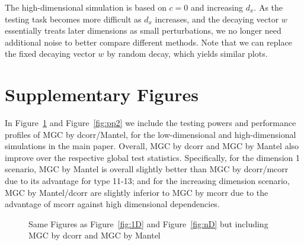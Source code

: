 \documentclass[11pt]{article}
\begin{document}
The high-dimensional simulation is based on $c=0$ and increasing $d_{x}$. As the testing task becomes more difficult as $d_{x}$ increases, and the decaying vector $w$ essentially treats later dimensions as small perturbations, we no longer need additional noise to better compare different methods. Note that we can replace the fixed decaying vector $w$ by random decay, which yields similar plots.


\section{Supplementary Figures}
\label{sec:sf}
In Figure~\ref{fig:D2} and Figure~\ref{fig:pp2} we include the testing powers and performance profiles of MGC by dcorr/Mantel, for the low-dimensional and high-dimensional simulations in the main paper. Overall, MGC by dcorr and MGC by Mantel also improve over the respective global test statistics. Specifically, for the dimension 1 scenario, MGC by Mantel is overall slightly better than MGC by dcorr/mcorr due to its advantage for type 11-13; and for the increasing dimension scenario, MGC by Mantel/dcorr are slightly inferior to MGC by mcorr due to the advantage of mcorr against high dimensional dependencies.

\begin{figure}[htbp]
\hfil
{}
\caption{Same Figures as Figure~\ref{fig:1D} and Figure~\ref{fig:nD} but including MGC by dcorr and MGC by Mantel}
\label{fig:D2}
\end{figure}
\end{document}
